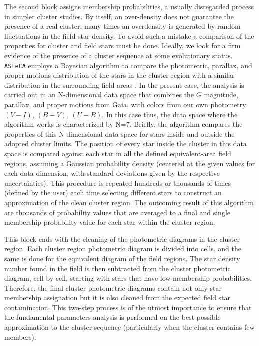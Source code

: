 \documentclass[draft]{aa}
\begin{document}
The second block assigns membership probabilities, a usually disregarded
process in simpler cluster studies. By itself, an over-density does not
guarantee the presence of a real cluster; many times an overdensity is
generated by random fluctuations in the field star density. To avoid such a
mistake a comparison of the properties for cluster and field stars
must be done. Ideally, we look for a firm evidence of the presence of a
cluster sequence at some evolutionary status. \texttt{ASteCA} employs a
Bayesian algorithm to compare the photometric, parallax, and proper motions
distribution of the stars in the cluster region with a similar distribution in
the surrounding field areas \citep{Perren_2015}. In the present case, the
analysis is carried out in an N-dimensional data space that combines the
$G$ magnitude, parallax, and proper motions from Gaia, with colors from our own
photometry: $(V-I)$, $(B-V)$, $(U-B)$. In this case thus, the data space where
the algorithm works is characterized by N=7.
%
Briefly, the algorithm compares the properties of this N-dimensional data space
for stars inside and outside the adopted cluster limits.
The position of every star inside the cluster in this data space is compared
against each star in all the defined equivalent-area field regions,
assuming a Gaussian probability density (centered at the given values for each
data dimension, with standard deviations given by the respective
uncertainties). This procedure is repeated hundreds or thousands of times 
(defined by the user) each time selecting different stars to construct an
approximation of the clean cluster region. The outcoming result of this
algorithm are thousands of probability values that are averaged to a final and
single membership probability value for each star within the cluster region.

This block ends with the cleaning of the photometric diagrams in the cluster
region. Each cluster region photometric diagram is divided into cells, and
the same is done for the equivalent diagram of the field regions. The star
density number found in the field is then subtracted from the cluster
photometric diagram, cell by cell, starting with stars that have low
membership probabilities. Therefore, the final cluster photometric diagrams
contain not only star membership assignation but it is also cleaned from the
expected field star contamination. This two-step process is of the utmost
importance to ensure that the fundamental parameters analysis is performed on
the best possible approximation to the cluster sequence (particularly when
the cluster contains few members).\\
\end{document}
